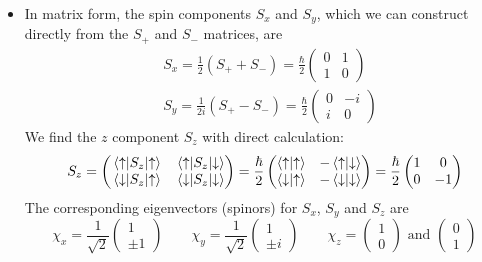 \documentclass[11pt, a4paper]{article}
\newcommand{\ua}{\uparrow}  %
\newcommand{\da}{\downarrow}  %
\begin{document}
\begin{itemize}
	\item In matrix form, the spin components $ S_{x} $ and $ S_{y} $, which we can construct directly from the $ S_{+} $ and $ S_{-} $ matrices, are
	\begin{align*}
		& S_{x} = \frac{1}{2}(S_{+} + S_{-}) = \frac{\hbar}{2}
		\begin{pmatrix}
			0 & 1\\
			1 & 0
		\end{pmatrix}
		\\
		& S_{y} = \frac{1}{2i}(S_{+} - S_{-}) = \frac{\hbar}{2}
		\begin{pmatrix}
			0 & - i\\
			i & 0
		\end{pmatrix}
	\end{align*}
	We find the $ z $ component $ S_{z} $ with direct calculation:
	\begin{equation*}
		S_{z} = 
		\begin{pmatrix}
			\mel{\ua}{S_{z}}{\ua} & \mel{\ua}{S_{z}}{\da}\\
			\mel{\da}{S_{z}}{\ua} & \mel{\da}{S_{z}}{\da}
		\end{pmatrix}
		= \frac{\hbar}{2}
		\begin{pmatrix}
			\braket{\ua}{\ua} & - \braket{\ua}{\da}\\
			\braket{\da}{\ua} & - \braket{\da}{\da}
		\end{pmatrix}
		= \frac{\hbar}{2}
		\begin{pmatrix}
			1 & 0\\
			0 & -1
		\end{pmatrix}
	\end{equation*}
	The corresponding eigenvectors (spinors) for $ S_{x} $, $ S_{y} $ and $ S_{z} $ are
	\begin{equation*}
		\chi_{x} = \frac{1}{\sqrt{2}}
		\begin{pmatrix}
			1\\
			\pm 1
		\end{pmatrix} \qquad 
		\chi_{y} = \frac{1}{\sqrt{2}}
		\begin{pmatrix}
			1\\
			\pm i
		\end{pmatrix} \qquad
		\chi_{z} =
		\begin{pmatrix}
			1\\
			0
		\end{pmatrix}
		\text{ and }
		\begin{pmatrix}
			0\\
			1
		\end{pmatrix}
	\end{equation*}
	

\end{itemize}
\end{document}
